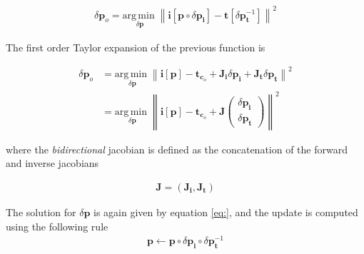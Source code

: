 \begin{equation}
	\begin{aligned}
		\delta \mathbf{p}_o = \underset{\delta \mathbf{p}}{\mathrm{arg\,min\;}}
		\left\| \mathbf{i}[\mathbf{p} \circ \delta \mathbf{p}_{\mathbf{i}}] - \mathbf{t}[\delta \mathbf{p}_{\mathbf{t}}^{-1}] \right\|^2
	\end{aligned}
\end{equation}

The first order Taylor expansion of the previous function is

\begin{equation}
	\begin{aligned}
		\delta \mathbf{p}_o & = \underset{\delta \mathbf{p}}{\mathrm{arg\,min\;}}
		\left\| \mathbf{i}[\mathbf{p}] - \mathbf{t}_{\mathbf{c}_o} + 
		\mathbf{J}_{\mathbf{i}} \delta \mathbf{p}_{\mathbf{i}} + \mathbf{J}_{\mathbf{t}} \delta \mathbf{p}_{\mathbf{t}} \right\|^2
		\\
		& = \underset{\delta \mathbf{p}}{\mathrm{arg\,min\;}}
		\left\| \mathbf{i}[\mathbf{p}] - \mathbf{t}_{\mathbf{c}_o} + \mathbf{J} 
		\begin{pmatrix}
		\delta \mathbf{p}_{\mathbf{i}}
		\\ 
		\delta \mathbf{p}_{\mathbf{t}}
		\end{pmatrix} \right\|^2
	\end{aligned}
\end{equation}

where the \emph{bidirectional} jacobian is defined as the concatenation of the forward and inverse jacobians

\begin{equation}
	\begin{aligned}
		\mathbf{J} = \left( \mathbf{J}_{\mathbf{i}}, \mathbf{J}_{\mathbf{t}} \right)
	\end{aligned}
\end{equation}

The solution for $\delta \mathbf{p}$ is again given by equation \ref{eq:}, and the update is computed using the following rule
\begin{equation}
	\begin{aligned}
		\mathbf{p} \leftarrow \mathbf{p} \circ \delta \mathbf{p}_{\mathbf{i}} \circ \delta \mathbf{p}_{\mathbf{t}}^{-1} 
	\end{aligned}
\end{equation}
